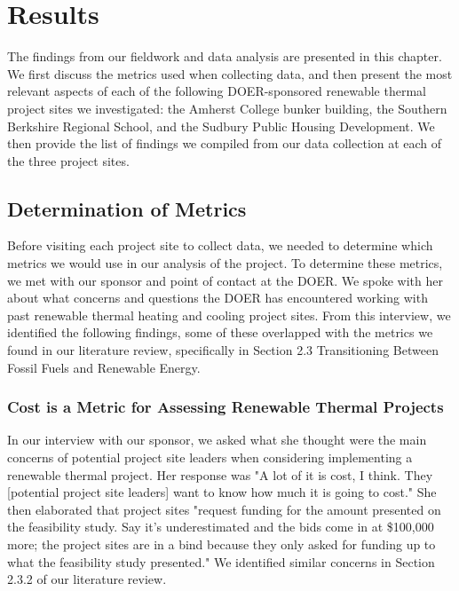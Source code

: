 
\chapter{Results}
\par The findings from our fieldwork and data analysis are presented in this chapter. We first discuss the metrics used when collecting data, and then present the most relevant aspects of each of the following DOER-sponsored renewable thermal project sites we investigated: the Amherst College bunker building, the Southern Berkshire Regional School, and the Sudbury Public Housing Development. We then provide the list of findings we compiled from our data collection at each of the three project sites.

\section{Determination of Metrics}
\par Before visiting each project site to collect data, we needed to determine which metrics we would use in our analysis of the project. To determine these metrics, we met with our sponsor and point of contact at the DOER. We spoke with her about what concerns and questions the DOER has encountered working with past renewable thermal heating and cooling project sites. From this interview, we identified the following findings, some of these overlapped with the metrics we found in our literature review, specifically in Section 2.3 Transitioning Between Fossil Fuels and Renewable Energy.

\subsection{Cost is a Metric for Assessing Renewable Thermal Projects}
\par In our interview with our sponsor, we asked what she thought were the main concerns of potential project site leaders when considering implementing a renewable thermal project. Her response was "A lot of it is cost, I think. They [potential project site leaders] want to know how much it is going to cost." She then elaborated that project sites "request funding for the amount presented on the feasibility study. Say it's underestimated and the bids come in at \$100,000 more; the project sites are in a bind because they only asked for funding up to what the feasibility study presented." We identified similar concerns in Section 2.3.2 of our literature review.

